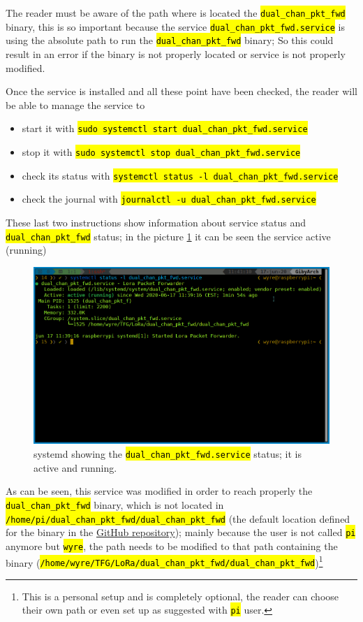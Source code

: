 \documentclass[11pt,a4paper,dvipsnames,twoside]{article}
\newcommand{\cmd}[1] {\hl{\texttt{#1}}}
\begin{document}
The reader must be aware of the path where is located the \cmd{dual\_chan\_pkt\_fwd} binary, this is so important because the service \cmd{dual\_chan\_pkt\_fwd.service} is using the absolute path to run the \cmd{dual\_chan\_pkt\_fwd} binary; So this could result in an error if the binary is not properly located or service is not properly modified.

Once the service is installed and all these point have been checked, the reader will be able to manage the service to

\begin{itemize}
  \item start it with \cmd{sudo systemctl start dual\_chan\_pkt\_fwd.service}
  \item stop it with \cmd{sudo systemctl stop dual\_chan\_pkt\_fwd.service}
  \item check its status with \cmd{systemctl status -l dual\_chan\_pkt\_fwd.service}
  \item check the journal with \cmd{journalctl -u dual\_chan\_pkt\_fwd.service}
\end{itemize}

These last two instructions show information about service status and \cmd{dual\_chan\_pkt\_fwd} status; in the picture \ref{fig:dual_chan_pkt_fwd-status} it can be seen the service active (running)

\begin{figure}[ht]
  \centering
  \includegraphics[width=.9\textwidth]{../pictures/pkt_fwd-service.png}
  \caption{systemd showing the \cmd{dual\_chan\_pkt\_fwd.service} status; it is active and running.}
  \label{fig:dual_chan_pkt_fwd-status}
\end{figure}

As can be seen, this service was modified in order to reach properly the \cmd{dual\_chan\_pkt\_fwd} binary, which is not located in \cmd{/home/pi/dual\_chan\_pkt\_fwd/dual\_chan\_pkt\_fwd} (the default location defined for the binary in the \href{https://github.com/dragino/dual_chan_pkt_fwd/blob/master/dual_chan_pkt_fwd.service#L9}{GitHub repository}); mainly because the user is not called \cmd{pi} anymore but \cmd{wyre}, the path needs to be modified to that path containing the binary (\cmd{/home/wyre/TFG/LoRa/dual\_chan\_pkt\_fwd/dual\_chan\_pkt\_fwd})\footnote{This is a personal setup and is completely optional, the reader can choose their own path or even set up as suggested with \cmd{pi} user.}
\end{document}
